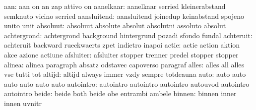                       aan: aan                       on
                           an                        zap
                           attivo                    on
                aanelkaar: aanelkaar                 serried
                           kleinerabstand            semknuto
                           vicino                    serried
              aansluitend: aansluitend               joinedup
                           keinabstand               spojeno
                           unito                     unit
                 absoluut: absoluut                  absolute
                           absolut                   absolutni
                           assoluto                  absolut
              achtergrond: achtergrond               background
                           hintergrund               pozadi
                           sfondo                    fundal
                achteruit: achteruit                 backward
                           rueckwaerts               zpet
                           indietro                  inapoi
                    actie: actie                     action
                           aktion                    akce
                           azione                    actiune
                afsluiter: afsluiter                 stopper
                           trenner                   predel
                           stopper                   stopper
                   alinea: alinea                    paragraph
                           absatz                    odstavec
                           capoverso                 paragraf
                    alles: alles                     all
                           alles                     vse
                           tutti                     tot
                   altijd: altijd                    always
                           immer                     vzdy
                           sempre                    totdeauna
                     auto: auto                      auto
                           auto                      auto
                           auto                      auto
                autointro: autointro                 autointro
                           autointro                 autouvod
                           autointro                 autointro
                    beide: beide                     both
                           beide                     obe
                           entrambi                  ambele
                   binnen: binnen                    inner
                           innen                     uvnitr
